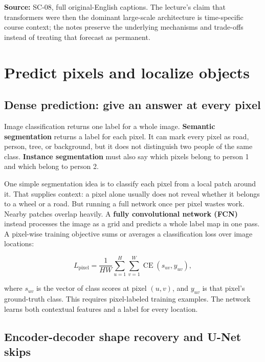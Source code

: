 \textbf{Source:} SC-08, full original-English captions. The lecture's claim that transformers were then the dominant large-scale architecture is time-specific course context; the notes preserve the underlying mechanisms and trade-offs instead of treating that forecast as permanent.

\section{Predict pixels and localize objects}\label{04-visual-computing-ii-ch031-predict-pixels-and-localize-objects}

\hypertarget{04-visual-computing-ii-ch031-predict-pixels-and-localize-objects}{}

\subsection{Dense prediction: give an answer at every pixel}\label{04-visual-computing-ii-ch031-dense-prediction-give-an-answer-at-every-pixel}

\hypertarget{04-visual-computing-ii-ch031-dense-prediction-give-an-answer-at-every-pixel}{}

Image classification returns one label for a whole image. \textbf{Semantic segmentation} returns a label for each pixel. It can mark every pixel as road, person, tree, or background, but it does not distinguish two people of the same class. \textbf{Instance segmentation} must also say which pixels belong to person 1 and which belong to person 2.

One simple segmentation idea is to classify each pixel from a local patch around it. That supplies context: a pixel alone usually does not reveal whether it belongs to a wheel or a road. But running a full network once per pixel wastes work. Nearby patches overlap heavily. A \textbf{fully convolutional network (FCN)} instead processes the image as a grid and predicts a whole label map in one pass. A pixel-wise training objective sums or averages a classification loss over image locations:

\[
L_{\text{pixel}}=\frac{1}{HW}\sum_{u=1}^{H}\sum_{v=1}^{W}\operatorname{CE}(s_{uv},y_{uv}),
\]

where \(s_{uv}\) is the vector of class scores at pixel \((u,v)\), and \(y_{uv}\) is that pixel's ground-truth class. This requires pixel-labeled training examples. The network learns both contextual features and a label for every location.

\subsection{Encoder-decoder shape recovery and U-Net skips}\label{04-visual-computing-ii-ch031-encoder-decoder-shape-recovery-and-u-net-skips}

